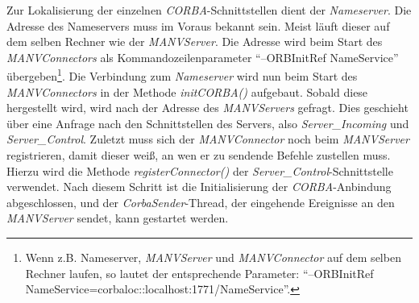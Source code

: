 Zur Lokalisierung der einzelnen \emph{CORBA}-Schnittstellen dient der \emph{Nameserver}.
Die Adresse des Nameservers muss im Voraus bekannt sein. Meist läuft dieser auf dem selben Rechner
wie der \emph{MANVServer}. Die Adresse wird beim Start des \emph{MANVConnectors} als 
Kommandozeilenparameter "`--ORBInitRef NameService"' übergeben\footnote{Wenn z.B. Nameserver, \emph{MANVServer}
und \emph{MANVConnector} auf dem selben Rechner laufen, so lautet der entsprechende Parameter:
"`--ORBInitRef NameService=corbaloc::localhost:1771/NameService"'.}. Die Verbindung zum \emph{Nameserver}
wird nun beim Start des \emph{MANVConnectors} in der Methode \emph{initCORBA()} aufgebaut. 
Sobald diese hergestellt wird, wird nach der Adresse des \emph{MANVServers} gefragt. Dies geschieht über
eine Anfrage nach den Schnittstellen des Servers, also \emph{Server\_Incoming} und \emph{Server\_Control}. 
Zuletzt muss sich der \emph{MANVConnector} noch beim \emph{MANVServer} registrieren, damit dieser
weiß, an wen er zu sendende Befehle zustellen muss. Hierzu wird die Methode \emph{registerConnector()}
der \emph{Server\_Control}-Schnittstelle verwendet. Nach diesem Schritt ist die Initialisierung der
\emph{CORBA}-Anbindung abgeschlossen, und der \emph{CorbaSender}-Thread, der eingehende Ereignisse
an den \emph{MANVServer} sendet, kann gestartet werden.
